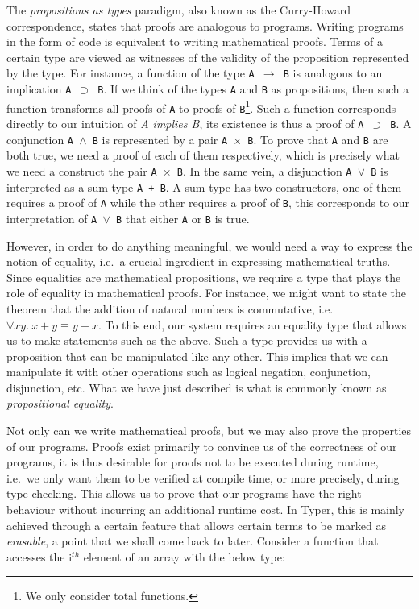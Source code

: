 \documentclass[12pt,twoside,maitrise]{dms}
\theoremstyle{definition}
\numberwithin{equation}{section}
\numberwithin{table}{chapter}
\numberwithin{figure}{chapter}
\newcommand\fn[1] {\texttt{#1}}
\begin{document}
The \emph{propositions as types} paradigm, also known as the Curry-Howard
correspondence, states that proofs are analogous to programs. Writing programs
in the form of code is equivalent to writing mathematical proofs. Terms of a
certain type are viewed as witnesses of the validity of the proposition
represented by the type. For instance, a function of the type \fn{A
  $\rightarrow$ B} is analogous to an implication \fn{A $\supset$ B}. If we
think of the types \fn{A} and \fn{B} as propositions, then such a function
transforms all proofs of \fn{A} to proofs of \fn{B}\footnote{We only consider
total functions.}. Such a function corresponds directly to our intuition of
\emph{A implies B}, its existence is thus a proof of \fn{A $\supset$ B}. A
conjunction \fn{A $\wedge$ B} is represented by a pair \fn{A $\times$ B}. To
prove that \fn{A} and \fn{B} are both true, we need a proof of each of them
respectively, which is precisely what we need a construct the pair \fn{A
  $\times$ B}. In the same vein, a disjunction \fn{A $\vee$ B} is interpreted as
a sum type \fn{A + B}. A sum type has two constructors, one of them requires a
proof of \fn{A} while the other requires a proof of \fn{B}, this corresponds to
our interpretation of \fn{A $\vee$ B} that either \fn{A} or \fn{B} is true.

However, in order to do anything meaningful, we would need a way to express the
notion of equality, i.e.\ a crucial ingredient in expressing mathematical
truths. Since equalities are mathematical propositions, we require a type that
plays the role of equality in mathematical proofs. For instance, we might want
to state the theorem that the addition of natural numbers is commutative, i.e.
$\forall xy. \ x + y \equiv y + x$. To this end, our system requires an equality
type that allows us to make statements such as the above. Such a type provides
us with a proposition that can be manipulated like any other. This implies that
we can manipulate it with other operations such as logical negation,
conjunction, disjunction, etc. What we have just described is what is commonly
known as \emph{propositional equality}.


Not only can we write mathematical proofs, but we may also prove the properties of
our programs. Proofs exist primarily to convince us of the correctness of our
programs, it is thus desirable for proofs not to be executed during runtime,
i.e.\ we only want them to be verified at compile time, or more precisely,
during type-checking. This allows us to prove that our programs have the right
behaviour without incurring an additional runtime cost. In Typer, this is mainly
achieved through a certain feature that allows certain terms to be marked as
\emph{erasable}, a point that we shall come back to later. Consider a function
that accesses the i$^{th}$ element of an array with the below type:
\end{document}
